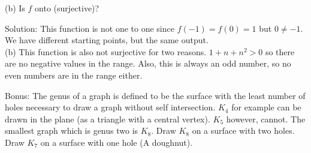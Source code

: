 \documentclass[16 pt]{amsart}
\theoremstyle{definition}
\theoremstyle{remark}
\numberwithin{equation}{subsection}
\begin{document}
(b) Is $f$ onto (surjective)?

\vspace{1in}

Solution: This function is not one to one since $f(-1) = f(0) = 1$ but $0\ne -1$.  We have different starting points, but the same output.\\

(b) This function is also not surjective for two reasons.  $1+n+n^2 > 0 $ so there are no negative values in the range.  Also, this is always an odd number, so no even numbers are in the range either.


\newpage

Bonus: The genus of a graph is defined to be the surface with the least number of holes necessary to draw a graph without self intersection.  $K_4$ for example can be drawn in the plane (as a triangle with a central vertex).  $K_5$ however, cannot.  The smallest graph which is genus two is $K_8$.  Draw $K_8$ on a surface with two holes.  Draw $K_7$ on a surface with one hole (A doughnut).
\end{document}

